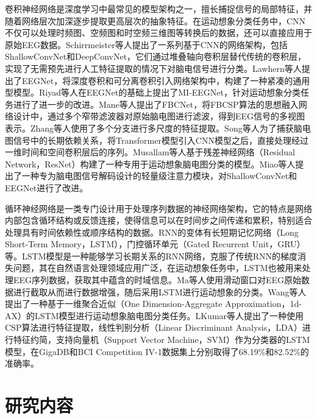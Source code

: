 卷积神经网络是深度学习中最常见的模型架构之一，擅长捕捉信号的局部特征，并随着网络层次加深逐步提取更高层次的抽象特征。在运动想象分类任务中，CNN不仅可以处理时频图、空频图和时空频三维图等转换后的数据，还可以直接应用于原始EEG数据。Schirrmeister等人\cite{schirrmeister2017deep}提出了一系列基于CNN的网络架构，包括ShallowConvNet和DeepConvNet，它们通过堆叠轴向卷积层替代传统的卷积层，实现了无需预先进行人工特征提取的情况下对脑电信号进行分类。Lawhern等人\cite{lawhern2018eegnet}提出了EEGNet，将深度卷积和可分离卷积引入网络架构中，构建了一种紧凑的通用型模型。Riyad等人\cite{riyad2021mi}在EEGNet的基础上提出了MI-EEGNet，针对运动想象分类任务进行了进一步的改进。Mane等人\cite{mane2021fbcnet}提出了FBCNet，将FBCSP算法的思想融入网络设计中，通过多个窄带滤波器对原始脑电图进行滤波，得到EEG信号的多视图表示。Zhang等人\cite{zhang2021eeg}使用了多个分支进行多尺度的特征提取。Song等人\cite{song2022eeg}为了捕获脑电图信号中的长期依赖关系，将Transformer\cite{vaswani2017attention}模型引入CNN模型之后，直接处理经过一维时间和空间卷积层后的序列。Musallam等人\cite{musallam2021electroencephalography}基于残差神经网络（Residual Network，ResNet）\cite{he2016deep}构建了一种专用于运动想象脑电图分类的模型。Miao等人\cite{miao2023lmda}提出了一种专为脑电图信号解码设计的轻量级注意力模块，对ShallowConvNet和EEGNet进行了改进。

循环神经网络是一类专门设计用于处理序列数据的神经网络架构，它的特点是网络内部包含循环结构或反馈连接，使得信息可以在时间步之间传递和累积，特别适合处理具有时间依赖性或顺序结构的数据。RNN的变体有长短期记忆网络（Long Short-Term Memory，LSTM），门控循环单元（Gated Recurrent Unit，GRU）等。LSTM模型是一种能够学习长期关系的RNN网络，克服了传统RNN的梯度消失问题，其在自然语言处理领域应用广泛，在运动想象任务中，LSTM也被用来处理EEG序列数据，获取其中蕴含的时域信息。Ma等人\cite{ma2018improving}使用滑动窗口对EEG原始数据进行截取从而进行数据增强，随后采用LSTM进行运动想象的分类。Wang等人\cite{wang2018lstm}提出了一种基于一维聚合近似（One Dimension-Aggregate Approximation，1d-AX）的LSTM模型进行运动想象脑电图分类任务。LKumar等人\cite{kumar2019brain}提出了一种使用CSP算法进行特征提取，线性判别分析（Linear Discriminant Analysis，LDA）进行特征约简，支持向量机（Support Vector Machine，SVM）作为分类器的LSTM模型，在GigaDB\cite{cho2017eeg}和BCI Competition IV-1\cite{blankertz2007non}数据集上分别取得了68.19\%和82.52\%的准确率。

\section{研究内容}


